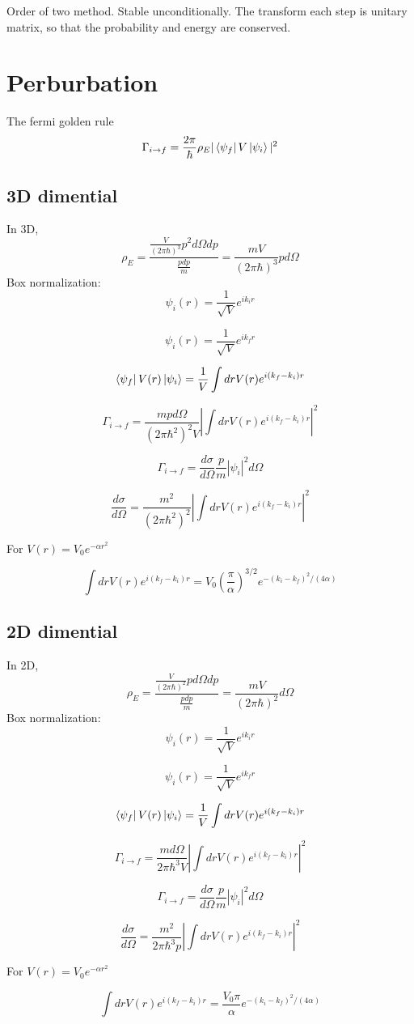 \documentclass[12pt,twoside]{article}
\begin{document}
Order of two method.
Stable unconditionally.
The transform each step is unitary matrix, so that the probability and energy are conserved.


\section{Perburbation}

The fermi golden rule
$$
\Gamma_{i\rightarrow f} = \frac{2\pi}{\hbar} \rho_E |\bra{\psi_f}V\ket{\psi_i}|^2
$$

\subsection{3D dimential}

In 3D,
$$
\rho_E = \frac{
\frac{V}{(2\pi\hbar)^3}{ p^2 d\Omega dp}
}{
\frac{p dp}{m}
}
=
\frac{m V}{(2\pi\hbar)^3}{ p d\Omega}
$$
Box normalization:
$$
\psi_i(r) = \frac{1}{\sqrt{V}} e^{i k_i r}
$$

$$
\psi_i(r) = \frac{1}{\sqrt{V}} e^{i k_f r}
$$

$$
\bra{\psi_f} V(r) \ket{\psi_i} =  \frac{1}{V} \int dr V(r) e^{i(k_f - k_i) r}
$$

$$
\Gamma_{i\rightarrow f} = \frac{mp d\Omega}{(2\pi \hbar^2)^2 V} |\int dr V(r) e^{i(k_f - k_i) r}|^2
$$

$$
\Gamma_{i\rightarrow f} = \frac{d\sigma}{d\Omega} \frac{p}{m} |\psi_i|^2 d\Omega
$$

$$
\frac{d\sigma}{d\Omega} = \frac{m^2}{(2\pi \hbar^2)^2} |\int dr V(r) e^{i(k_f - k_i) r}|^2
$$

For $V(r) = V_0 e^{-\alpha r^2}$

$$
\int dr V(r) e^{i(k_f - k_i) r} = V_0 (\frac{\pi}{\alpha})^{3/2} e^{-(k_i - k_f)^2/(4\alpha)}
$$


\subsection{2D dimential}

In 2D,
$$
\rho_E = \frac{
\frac{V}{(2\pi\hbar)^2}{ p d\Omega dp}
}{
\frac{p dp}{m}
}
=
\frac{m V}{(2\pi\hbar)^2}{d\Omega}
$$
Box normalization:
$$
\psi_i(r) = \frac{1}{\sqrt{V}} e^{i k_i r}
$$

$$
\psi_i(r) = \frac{1}{\sqrt{V}} e^{i k_f r}
$$

$$
\bra{\psi_f} V(r) \ket{\psi_i} =  \frac{1}{V} \int dr V(r) e^{i(k_f - k_i) r}
$$

$$
\Gamma_{i\rightarrow f} = \frac{m d\Omega}{2\pi \hbar^3 V} |\int dr V(r) e^{i(k_f - k_i) r}|^2
$$

$$
\Gamma_{i\rightarrow f} = \frac{d\sigma}{d\Omega} \frac{p}{m} |\psi_i|^2 d\Omega
$$

$$
\frac{d\sigma}{d\Omega} = \frac{m^2}{2\pi \hbar^3 p} |\int dr V(r) e^{i(k_f - k_i) r}|^2
$$

For $V(r) = V_0 e^{-\alpha r^2}$

$$
\int dr V(r) e^{i(k_f - k_i) r} = \frac{V_0 \pi}{\alpha} e^{-(k_i - k_f)^2/(4\alpha)}
$$
\end{document}
